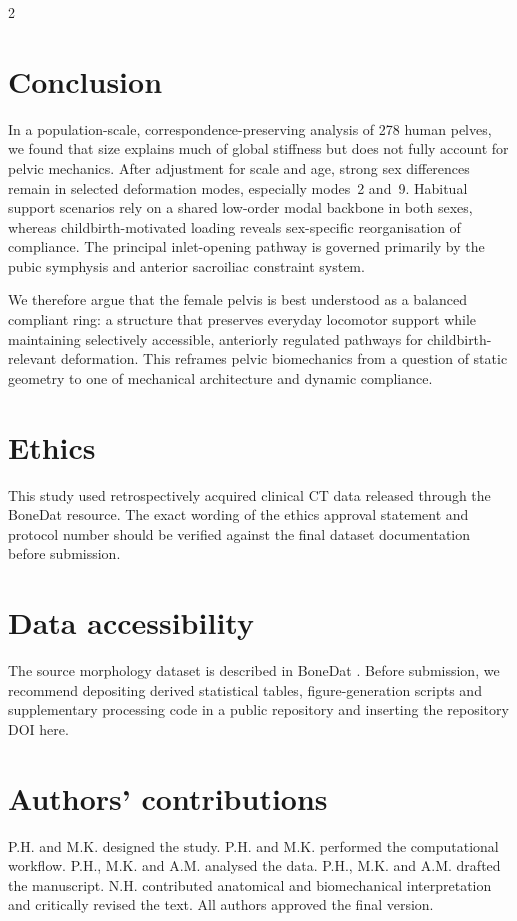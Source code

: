 \documentclass[openacc]{rsproca_new}
\begin{document}
\begin{multicols}{2}
\section{Conclusion}

In a population-scale, correspondence-preserving analysis of 278 human pelves, we found that size explains much of global stiffness but does not fully account for pelvic mechanics. After adjustment for scale and age, strong sex differences remain in selected deformation modes, especially modes~2 and~9. Habitual support scenarios rely on a shared low-order modal backbone in both sexes, whereas childbirth-motivated loading reveals sex-specific reorganisation of compliance. The principal inlet-opening pathway is governed primarily by the pubic symphysis and anterior sacroiliac constraint system.

We therefore argue that the female pelvis is best understood as a balanced compliant ring: a structure that preserves everyday locomotor support while maintaining selectively accessible, anteriorly regulated pathways for childbirth-relevant deformation. This reframes pelvic biomechanics from a question of static geometry to one of mechanical architecture and dynamic compliance.

\section*{Ethics}

This study used retrospectively acquired clinical CT data released through the BoneDat resource. The exact wording of the ethics approval statement and protocol number should be verified against the final dataset documentation before submission.

\section*{Data accessibility}

The source morphology dataset is described in BoneDat \cite{HenysKuchar2025}. Before submission, we recommend depositing derived statistical tables, figure-generation scripts and supplementary processing code in a public repository and inserting the repository DOI here.

\section*{Authors' contributions}

P.H. and M.K. designed the study. P.H. and M.K. performed the computational workflow. P.H., M.K. and A.M. analysed the data. P.H., M.K. and A.M. drafted the manuscript. N.H. contributed anatomical and biomechanical interpretation and critically revised the text. All authors approved the final version.


\end{multicols}
\end{document}
